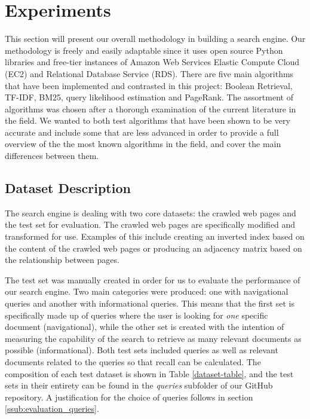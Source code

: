 



\section{Experiments} %
\label{sec:experiment}

This section will present our overall methodology in building a search engine. Our methodology is freely and easily adaptable since it uses open source Python libraries and free-tier instances of Amazon Web Services Elastic Compute Cloud (EC2) and Relational Database Service (RDS). There are five main algorithms that have been implemented and contrasted in this project: Boolean Retrieval, TF-IDF, BM25, query likelihood estimation and PageRank. The assortment of algorithms was chosen after a thorough examination of the current literature in the field. We wanted to both test algorithms that have been shown to be very accurate and include some that are less advanced in order to provide a full overview of the the most known algorithms in the field, and cover the main differences between them. 

\subsection{Dataset Description} %
\label{sub:dataset_description}

The search engine is dealing with two core datasets: the crawled web pages and the test set for evaluation. The crawled web pages are specifically modified and transformed for use. Examples of this include creating an inverted index based on the content of the crawled web pages or producing an adjacency matrix based on the relationship between pages. 

The test set was manually created in order for us to evaluate the performance of our search engine. Two main categories were produced: one with navigational queries and another with informational queries. This means that the first set is specifically made up of queries where the user is looking for \emph{one} specific document (navigational), while the other set is created with the intention of measuring the capability of the search to retrieve as many relevant documents as possible (informational). Both test sets included queries as well as relevant documents related to the queries so that recall can be calculated. The composition of each test dataset is shown in Table \ref{dataset-table}, and the test sets in their entirety can be found in the \emph{queries} subfolder of our GitHub repository.  A justification for the choice of queries follows in section \ref{ssub:evaluation_queries}.

